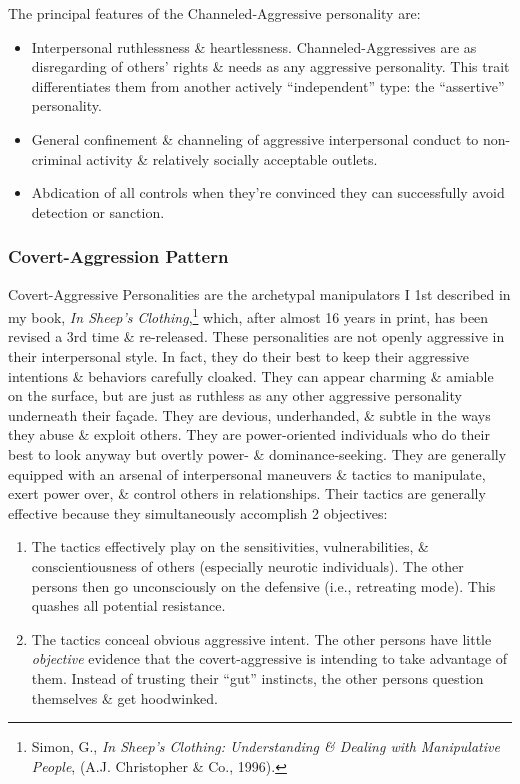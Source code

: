 \documentclass{article}
\numberwithin{equation}{section}
\begin{document}
The principal features of the Channeled-Aggressive personality are:
\begin{itemize}
	\item Interpersonal ruthlessness \& heartlessness. Channeled-Aggressives are as disregarding of others' rights \& needs as any aggressive personality. This trait differentiates them from another actively ``independent'' type: the ``assertive'' personality.
	\item General confinement \& channeling of aggressive interpersonal conduct to non-criminal activity \& relatively socially acceptable outlets.
	\item Abdication of all controls when they're convinced they can successfully avoid detection or sanction.
\end{itemize}

\subsubsection{Covert-Aggression Pattern}
Covert-Aggressive Personalities are the archetypal manipulators I 1st described in my book, \textit{In Sheep's Clothing},\footnote{Simon, G., \textit{In Sheep's Clothing: Understanding \& Dealing with Manipulative People}, (A.J. Christopher \& Co., 1996).} which, after almost 16 years in print, has been revised a 3rd time \& re-released. These personalities are not openly aggressive in their interpersonal style. In fact, they do their best to keep their aggressive intentions \& behaviors carefully cloaked. They can appear charming \& amiable on the surface, but are just as ruthless as any other aggressive personality underneath their fa\c{c}ade. They are devious, underhanded, \& subtle in the ways they abuse \& exploit others. They are power-oriented individuals who do their best to look anyway but overtly power- \& dominance-seeking. They are generally equipped with an arsenal of interpersonal maneuvers \& tactics to manipulate, exert power over, \& control others in relationships. Their tactics are generally effective because they simultaneously accomplish 2 objectives:
\begin{enumerate}
	\item The tactics effectively play on the sensitivities, vulnerabilities, \& conscientiousness of others (especially neurotic individuals). The other persons then go unconsciously on the defensive (i.e., retreating mode). This quashes all potential resistance.
	\item The tactics conceal obvious aggressive intent. The other persons have little \textit{objective} evidence that the covert-aggressive is intending to take advantage of them. Instead of trusting their ``gut'' instincts, the other persons question themselves \& get hoodwinked.
\end{enumerate}
\end{document}
